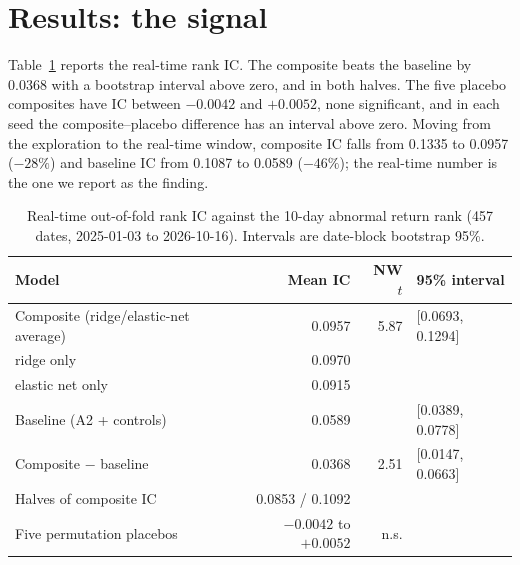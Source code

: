 \documentclass[11pt]{article}
\begin{document}
\section{Results: the signal}\label{sec:signal}

Table~\ref{tab:ic} reports the real-time rank IC. The composite beats the baseline by 0.0368 with a bootstrap interval above zero, and in both halves. The five placebo composites have IC between $-0.0042$ and $+0.0052$, none significant, and in each seed the composite--placebo difference has an interval above zero. Moving from the exploration to the real-time window, composite IC falls from 0.1335 to 0.0957 ($-28\%$) and baseline IC from 0.1087 to 0.0589 ($-46\%$); the real-time number is the one we report as the finding.

\begin{table}[ht]
\centering
\caption{Real-time out-of-fold rank IC against the 10-day abnormal return rank (457 dates, 2025-01-03 to 2026-10-16). Intervals are date-block bootstrap 95\%.}
\label{tab:ic}
\begin{tabular}{lrrl}
\toprule
Model & Mean IC & NW $t$ & 95\% interval \\
\midrule
Composite (ridge/elastic-net average) & 0.0957 & 5.87 & [0.0693, 0.1294] \\
\quad ridge only & 0.0970 & & \\
\quad elastic net only & 0.0915 & & \\
Baseline (A2 + controls) & 0.0589 & & [0.0389, 0.0778] \\
Composite $-$ baseline & 0.0368 & 2.51 & [0.0147, 0.0663] \\
Halves of composite IC & 0.0853 / 0.1092 & & \\
Five permutation placebos & $-0.0042$ to $+0.0052$ & n.s. & \\
\bottomrule
\end{tabular}
\end{table}
\end{document}
